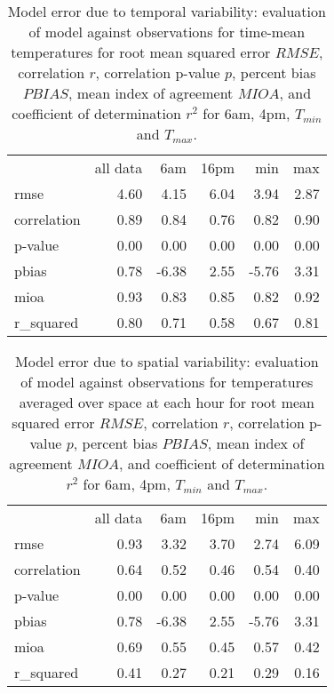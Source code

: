 \documentclass[draft,linenumbers]{agujournal}
\begin{document}
\begin{table}
\centering
\begin{tabular}{lrrrrr}
{} &  all data &     6am &   16pm &   min &  max \\
rmse        &      4.60 &  4.15 & 6.04 &  3.94 & 2.87 \\
correlation &      0.89 &  0.84 & 0.76 &  0.82 & 0.90 \\
p-value     &      0.00 &  0.00 & 0.00 &  0.00 & 0.00 \\
pbias       &      0.78 & -6.38 & 2.55 & -5.76 & 3.31 \\
mioa        &      0.93 &  0.83 & 0.85 &  0.82 & 0.92 \\
r\_squared   &      0.80 &  0.71 & 0.58 &  0.67 & 0.81 \\
\end{tabular}


\caption{Model error due to temporal variability: evaluation of model against observations for time-mean temperatures for root mean squared error $RMSE$, correlation  $r$, correlation p-value $p$, percent bias $PBIAS$, mean index of agreement $MIOA$, and coefficient of determination $r^2$ for 6am, 4pm, $T_{min}$ and $T_{max}$.  }
\label{tab:time_error}
\end{table}

\begin{table}
\centering
\begin{tabular}{lrrrrr}
{} &  all data &     6am &   16pm &   min &  max \\
rmse        &      0.93 &  3.32 & 3.70 &  2.74 & 6.09 \\
correlation &      0.64 &  0.52 & 0.46 &  0.54 & 0.40 \\
p-value     &      0.00 &  0.00 & 0.00 &  0.00 & 0.00 \\
pbias       &      0.78 & -6.38 & 2.55 & -5.76 & 3.31 \\
mioa        &      0.69 &  0.55 & 0.45 &  0.57 & 0.42 \\
r\_squared   &      0.41 &  0.27 & 0.21 &  0.29 & 0.16 \\
\end{tabular}


\caption{Model error due to spatial variability: evaluation of model against observations for temperatures averaged over space at each hour for root mean squared error $RMSE$, correlation  $r$, correlation p-value $p$, percent bias $PBIAS$, mean index of agreement $MIOA$, and coefficient of determination $r^2$ for 6am, 4pm, $T_{min}$ and $T_{max}$.  }
\label{tab:space_error}
\end{table}
\end{document}
